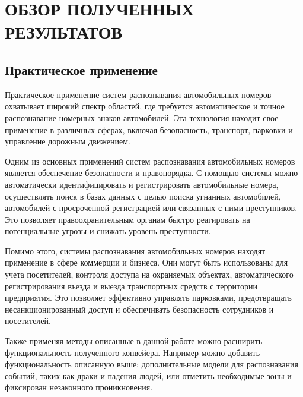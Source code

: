\newpage
\section{ОБЗОР ПОЛУЧЕННЫХ РЕЗУЛЬТАТОВ}
\subsection{Практическое применение}

Практическое применение систем распознавания автомобильных номеров  охватывает широкий спектр областей, где требуется автоматическое и точное распознавание номерных знаков автомобилей. Эта технология находит свое применение в различных сферах, включая безопасность, транспорт, парковки и управление дорожным движением.

Одним из основных применений систем распознавания автомобильных номеров является обеспечение безопасности и правопорядка. С помощью системы можно автоматически идентифицировать и регистрировать автомобильные номера, осуществлять поиск в базах данных с целью поиска угнанных автомобилей, автомобилей с просроченной регистрацией или связанных с ними преступников. Это позволяет правоохранительным органам быстро реагировать на потенциальные угрозы и снижать уровень преступности.

Помимо этого, системы распознавания автомобильных номеров находят применение в сфере коммерции и бизнеса. Они могут быть использованы для учета посетителей, контроля доступа на охраняемых объектах, автоматического регистрирования въезда и выезда транспортных средств с территории предприятия. Это позволяет эффективно управлять парковками, предотвращать несанкционированный доступ и обеспечивать безопасность сотрудников и посетителей.

Также применяя методы описанные в данной работе можно расширить функциональность полученного конвейера. Например можно добавить функциональность описанную выше: дополнительные модели для распознавания событий, таких как драки и падения людей, или отметить необходимые зоны и фиксирован незаконного проникновения.